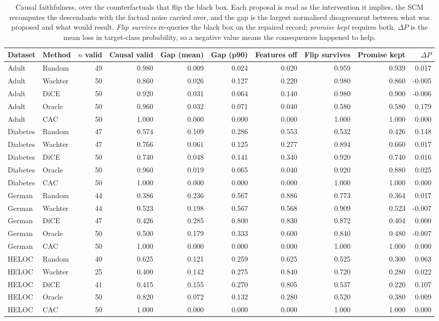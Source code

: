 \begin{table}[t]
\caption{Causal faithfulness, over the counterfactuals that flip the black box. Each proposal is read as the intervention it implies, the SCM recomputes the descendants with the factual noise carried over, and the gap is the largest normalised disagreement between what was proposed and what would result. \emph{Flip survives} re-queries the black box on the repaired record; \emph{promise kept} requires both. $\Delta P$ is the mean loss in target-class probability, so a negative value means the consequences happened to help.}
\label{tab:faithfulness}
\begin{tabular}{llrrrrrrrr}
\toprule
Dataset & Method & $n$ valid & Causal valid & Gap (mean) & Gap (p90) & Features off & Flip survives & Promise kept & $\Delta P$ \\
\midrule
Adult & Random & 49 & 0.980 & 0.009 & 0.024 & 0.020 & 0.959 & 0.939 & 0.017 \\
Adult & Wachter & 50 & 0.860 & 0.026 & 0.127 & 0.220 & 0.980 & 0.860 & -0.005 \\
Adult & DiCE & 50 & 0.920 & 0.031 & 0.064 & 0.140 & 0.980 & 0.900 & -0.006 \\
Adult & Oracle & 50 & 0.960 & 0.032 & 0.071 & 0.040 & 0.580 & 0.580 & 0.179 \\
Adult & CAC & 50 & 1.000 & 0.000 & 0.000 & 0.000 & 1.000 & 1.000 & 0.000 \\
Diabetes & Random & 47 & 0.574 & 0.109 & 0.286 & 0.553 & 0.532 & 0.426 & 0.148 \\
Diabetes & Wachter & 47 & 0.766 & 0.061 & 0.125 & 0.277 & 0.894 & 0.660 & 0.017 \\
Diabetes & DiCE & 50 & 0.740 & 0.048 & 0.141 & 0.340 & 0.920 & 0.740 & 0.016 \\
Diabetes & Oracle & 50 & 0.960 & 0.019 & 0.065 & 0.040 & 0.920 & 0.880 & 0.025 \\
Diabetes & CAC & 50 & 1.000 & 0.000 & 0.000 & 0.000 & 1.000 & 1.000 & 0.000 \\
German & Random & 44 & 0.386 & 0.236 & 0.567 & 0.886 & 0.773 & 0.364 & 0.017 \\
German & Wachter & 44 & 0.523 & 0.198 & 0.567 & 0.568 & 0.909 & 0.523 & -0.007 \\
German & DiCE & 47 & 0.426 & 0.285 & 0.800 & 0.830 & 0.872 & 0.404 & 0.000 \\
German & Oracle & 50 & 0.500 & 0.179 & 0.333 & 0.600 & 0.840 & 0.480 & -0.007 \\
German & CAC & 50 & 1.000 & 0.000 & 0.000 & 0.000 & 1.000 & 1.000 & 0.000 \\
HELOC & Random & 40 & 0.625 & 0.121 & 0.259 & 0.625 & 0.525 & 0.300 & 0.063 \\
HELOC & Wachter & 25 & 0.400 & 0.142 & 0.275 & 0.840 & 0.720 & 0.280 & 0.022 \\
HELOC & DiCE & 41 & 0.415 & 0.155 & 0.270 & 0.805 & 0.537 & 0.220 & 0.107 \\
HELOC & Oracle & 50 & 0.820 & 0.072 & 0.132 & 0.280 & 0.520 & 0.380 & 0.009 \\
HELOC & CAC & 50 & 1.000 & 0.000 & 0.000 & 0.000 & 1.000 & 1.000 & 0.000 \\
\bottomrule
\end{tabular}
\end{table}
